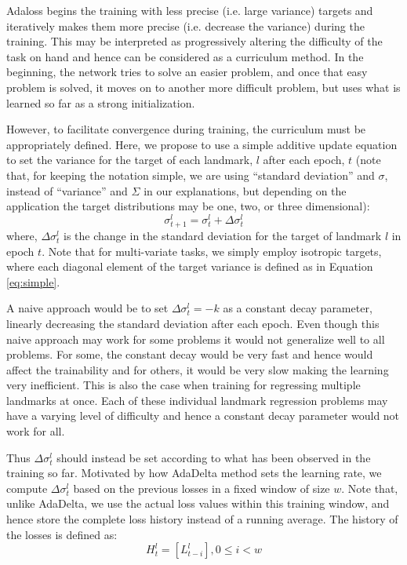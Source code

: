 \documentclass[10pt,twocolumn,letterpaper]{article}
\begin{document}
Adaloss begins the training with less precise (i.e. large variance) targets and iteratively makes them more precise (i.e. decrease the variance) during the training. This may be interpreted as progressively altering the difficulty of the task on hand and hence can be considered as a curriculum method. In the beginning, the network tries to solve an easier problem, and once that easy problem is solved, it moves on to another more difficult problem, but uses what is learned so far as a strong initialization.

However, to facilitate convergence during training, the curriculum must be appropriately defined. Here, we propose to use a simple additive update equation to set the variance for the target of each landmark, $l$ after each epoch, $t$ (note that, for keeping the notation simple, we are using ``standard deviation'' and $\sigma$, instead of ``variance'' and $\Sigma$ in our explanations, but depending on the application the target distributions may be one, two, or three dimensional):
\begin{equation}
\sigma^l_{t+1} = \sigma^l_{t} + \Delta\sigma^l_{t}
\label{eq:simple}
\end{equation}
where, $\Delta\sigma^l_{t}$ is the change in the standard deviation for the target of landmark $l$ in epoch $t$. Note that for multi-variate tasks, we simply employ isotropic targets, where each diagonal element of the target variance is defined as in Equation \ref{eq:simple}.

A naive approach would be to set $\Delta\sigma^l_{t} = -k$ as a constant decay parameter, linearly decreasing the standard deviation after each epoch. Even though this naive approach may work for some problems it would not generalize well to all problems. For some, the constant decay would be very fast and hence would affect the trainability and for others, it would be very slow making the learning very inefficient. This is also the case when training for regressing multiple landmarks at once. Each of these individual landmark regression problems may have a varying level of difficulty and hence a constant decay parameter would not work for all.



Thus $\Delta\sigma^l_{t}$ should instead be set according to what has been observed in the training so far. Motivated by how AdaDelta \cite{adadelta} method sets the learning rate, we compute $\Delta\sigma^l_{t}$ based on the previous losses in a fixed window of size $w$. Note that, unlike AdaDelta, we use the actual loss values within this training window, and hence store the complete loss history instead of a running average. The history of the losses is defined as:
\begin{equation}
H^l_t = [L^l_{t - i}], 0 \le i < w
\end{equation}
\end{document}
